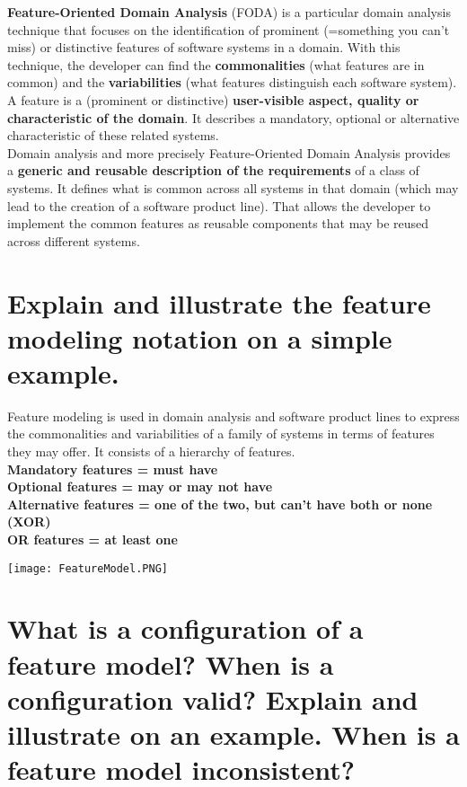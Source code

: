 \textbf{Feature-Oriented Domain Analysis} (FODA) is a particular domain analysis technique that focuses on the identification of prominent (=something you can’t miss) or distinctive features of software systems in a domain. With this technique, the developer can find the \textbf{commonalities} (what features are in common) and the \textbf{variabilities} (what features distinguish each software system).\\

A feature is a (prominent or distinctive) \textbf{user-visible aspect, quality or characteristic of the domain}. It describes a mandatory, optional or alternative characteristic of these related systems.\\

Domain analysis and more precisely Feature-Oriented Domain Analysis provides a \textbf{generic and reusable description of the requirements} of a class of systems. It defines what is common across all systems in that domain (which may lead to the creation of a software product line). That allows the developer to implement the common features as reusable components that may be reused across different systems.

\section{Explain and illustrate the feature modeling notation on a simple example.}

Feature modeling is used in domain analysis and software product lines to express the commonalities and variabilities of a family of systems in terms of features they may offer. It consists of a hierarchy of features.\\

\textbf{Mandatory features = must have}\\
\textbf{Optional features = may or may not have}\\
\textbf{Alternative features = one of the two, but can’t have both or none (XOR)}\\
\textbf{OR features = at least one}\\
\begin{center}
\texttt{[image: FeatureModel.PNG]}
\end{center}

\section{What is a configuration of a feature model? When is a configuration valid?
Explain and illustrate on an example. When is a feature model inconsistent?}

